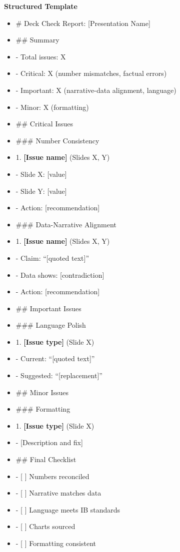 \documentclass[11pt]{article}
\begin{document}
\textbf{Structured Template}
\begin{itemize}[leftmargin=*,itemsep=2pt,topsep=2pt]
\item {} \# Deck Check Report: [Presentation Name]
\item {} \#\# Summary
\item {} - Total issues: X
\item {} - Critical: X (number mismatches, factual errors)
\item {} - Important: X (narrative-data alignment, language)
\item {} - Minor: X (formatting)
\item {} \#\# Critical Issues
\item {} \#\#\# Number Consistency
\item {} 1. \textbf{[Issue name]} (Slides X, Y)
\item {} - Slide X: [value]
\item {} - Slide Y: [value]
\item {} - Action: [recommendation]
\item {} \#\#\# Data-Narrative Alignment
\item {} 1. \textbf{[Issue name]} (Slides X, Y)
\item {} - Claim: ``[quoted text]''
\item {} - Data shows: [contradiction]
\item {} - Action: [recommendation]
\item {} \#\# Important Issues
\item {} \#\#\# Language Polish
\item {} 1. \textbf{[Issue type]} (Slide X)
\item {} - Current: ``[quoted text]''
\item {} - Suggested: ``[replacement]''
\item {} \#\# Minor Issues
\item {} \#\#\# Formatting
\item {} 1. \textbf{[Issue type]} (Slide X)
\item {} - [Description and fix]
\item {} \#\# Final Checklist
\item {} - [ ] Numbers reconciled
\item {} - [ ] Narrative matches data
\item {} - [ ] Language meets IB standards
\item {} - [ ] Charts sourced
\item {} - [ ] Formatting consistent
\end{itemize}
\end{document}
